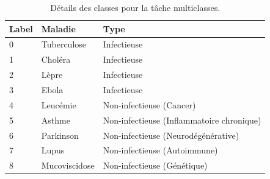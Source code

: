 \documentclass[12pt]{report}
\begin{document}
\begin{table}[H]
\centering
\begin{tabular}{|l|l|l|}
\hline
\textbf{Label} & \textbf{Maladie}         & \textbf{Type}                           \\ \hline
0              & Tuberculose              & Infectieuse                             \\ \hline
1              & Choléra                  & Infectieuse                             \\ \hline
2              & Lèpre                    & Infectieuse                             \\ \hline
3              & Ebola                    & Infectieuse                             \\ \hline
4              & Leucémie                 & Non-infectieuse (Cancer)                \\ \hline
5              & Asthme                   & Non-infectieuse (Inflammatoire chronique)\\ \hline
6              & Parkinson                & Non-infectieuse (Neurodégénérative)     \\ \hline
7              & Lupus                    & Non-infectieuse (Autoimmune)            \\ \hline
8              & Mucoviscidose            & Non-infectieuse (Génétique)             \\ \hline
\end{tabular}
\caption{Détails des classes pour la tâche multiclasses.}
\label{tab:multiclass_classes}
\end{table}
\end{document}
